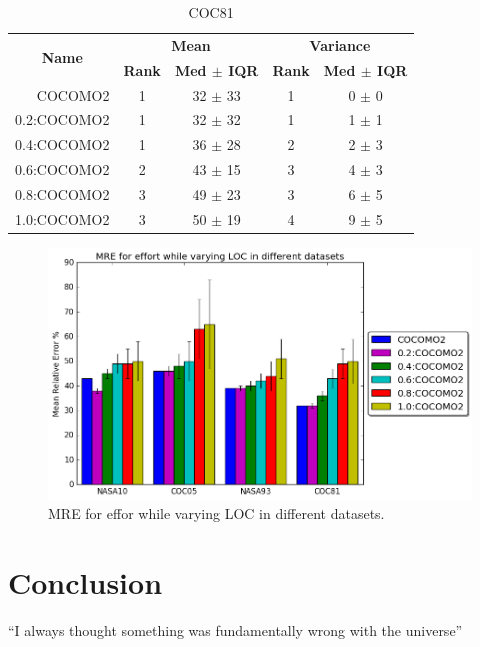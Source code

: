 \documentclass{article}
\begin{document}
\begin{table}[!htpb]
\centering
\caption{COC81}
\label{tab:coc81}
\begin{tabular}{|r|c|c|c|c|}
\hline
\multicolumn{1}{|c|}{\multirow{2}{*}{\textbf{Name}}} & \multicolumn{2}{c|}{\textbf{Mean}}     & \multicolumn{2}{c|}{\textbf{Variance}} \\ \cline{2-5} 
\multicolumn{1}{|c|}{}                               & \textbf{Rank} & \textbf{Med $\pm$ IQR} & \textbf{Rank} & \textbf{Med $\pm$ IQR} \\ \hline
COCOMO2                                              & 1             & 32 $\pm$ 33            & 1             & 0 $\pm$ 0              \\
0.2:COCOMO2                                          & 1             & 32 $\pm$ 32            & 1             & 1 $\pm$ 1              \\ \cline{4-5}
0.4:COCOMO2                                          & 1             & 36 $\pm$ 28            & 2             & 2 $\pm$ 3              \\ \cline{2-5}
0.6:COCOMO2                                          & 2             & 43 $\pm$ 15            & 3             & 4 $\pm$ 3              \\ \cline{2-3}
0.8:COCOMO2                                          & 3             & 49 $\pm$ 23            & 3             & 6 $\pm$ 5              \\ \cline{4-5}
1.0:COCOMO2                                          & 3             & 50 $\pm$ 19            & 4             & 9 $\pm$ 5      \\ \hline       
\end{tabular}
\end{table}


\begin{figure}
    \centering
    \includegraphics[scale=0.5]{Figs/mre.png}
    \caption{MRE for effor while varying LOC in different datasets.}
    \label{fig:mre_datasets}
\end{figure}

\section{Conclusion}
``I always thought something was fundamentally wrong with the universe'' \citep{adams1995hitchhiker}



\end{document}
